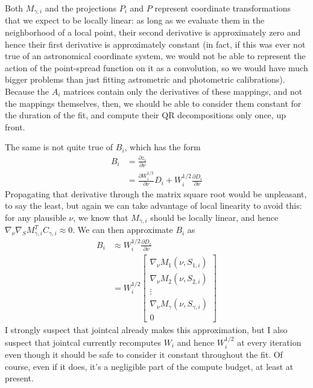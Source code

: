 Both $M_{\gamma,i}$ and the projections $P_i$ and $P$ represent coordinate transformations that we expect to be locally linear: as long as we evaluate them in the neighborhood of a local point, their second derivative is approximately zero and hence their first derivative is approximately constant (in fact, if this was ever not true of an astronomical coordinate system, we would not be able to represent the action of the point-spread function on it as a convolution, so we would have much bigger problems than just fitting astrometric and photometric calibrations).
Because the $A_i$ matrices contain only the derivatives of these mappings, and not the mappings themselves, then, we should be able to consider them constant for the duration of the fit, and compute their QR decompositions only once, up front.

The same is not quite true of $B_i$, which has the form
\begin{align}
    B_i &= \frac{\partial z_i}{\partial \nu} \\
        &= \frac{\partial W_i^{1/2}}{\partial \nu} D_i + W_i^{1/2}\frac{\partial D_i}{\partial \nu}
\end{align}
Propagating that derivative through the matrix square root would be unpleasant, to say the least, but again we can take advantage of local linearity to avoid this: for any plausible $\nu$, we know that $M_{\gamma,i}$ should be locally linear, and hence $\nabla\!_{\nu}\nabla\!_S M_{\gamma, i}^T C_{\gamma,i}\approx 0$.
We can then approximate $B_i$ as
\begin{align}
    B_i &\approx W_i^{1/2}\frac{\partial D_i}{\partial \nu} \\
        &= W_i^{1/2}\left[
            \begin{array}{ c }
                \nabla\!_{\nu} M_1\left(\nu, S_{1,i}\right) \\
                \nabla\!_{\nu} M_2\left(\nu, S_{2,i}\right) \\
                \vdots \\
                \nabla\!_{\nu} M_{\gamma}\left(\nu, S_{\gamma,i}\right) \\
                0
            \end{array}
        \right]
\end{align}
I strongly suspect that jointcal already makes this approximation, but I also suspect that jointcal currently recomputes $W_i$ and hence $W_i^{1/2}$ at every iteration even though it should be safe to consider it constant throughout the fit.
Of course, even if it does, it's a negligible part of the compute budget, at least at present.

